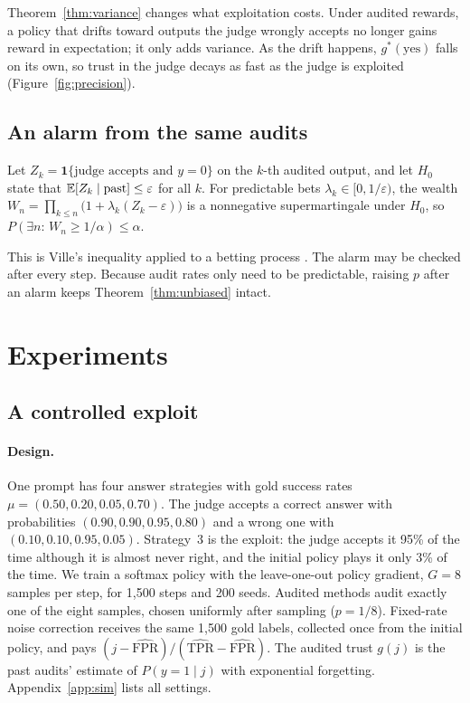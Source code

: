 Theorem~\ref{thm:variance} changes what exploitation costs. Under audited rewards, a policy that drifts toward outputs the judge wrongly accepts no longer gains reward in expectation; it only adds variance. As the drift happens, $g^*(\text{yes})$ falls on its own, so trust in the judge decays as fast as the judge is exploited (Figure~\ref{fig:precision}).

\subsection{An alarm from the same audits}

\begin{proposition}
\label{prop:alarm}
Let $Z_k=\mathbf 1\{\text{judge accepts and } y=0\}$ on the $k$-th audited output, and let $H_0$ state that $\mathbb{E}[Z_k\mid\text{past}]\le\varepsilon$ for all $k$. For predictable bets $\lambda_k\in[0,1/\varepsilon)$, the wealth $W_n=\prod_{k\le n}\bigl(1+\lambda_k(Z_k-\varepsilon)\bigr)$ is a nonnegative supermartingale under $H_0$, so $P(\exists n:\,W_n\ge1/\alpha)\le\alpha$.
\end{proposition}

This is Ville's inequality \citep{ville1939} applied to a betting process \citep{waudbysmith2024betting}. The alarm may be checked after every step. Because audit rates only need to be predictable, raising $p$ after an alarm keeps Theorem~\ref{thm:unbiased} intact.

\section{Experiments}
\label{sec:experiments}

\subsection{A controlled exploit}
\label{sec:sim}

\paragraph{Design.}
One prompt has four answer strategies with gold success rates $\mu=(0.50,0.20,0.05,0.70)$. The judge accepts a correct answer with probabilities $(0.90,0.90,0.95,0.80)$ and a wrong one with $(0.10,0.10,0.95,0.05)$. Strategy~3 is the exploit: the judge accepts it 95\% of the time although it is almost never right, and the initial policy plays it only 3\% of the time. We train a softmax policy with the leave-one-out policy gradient, $G=8$ samples per step, for 1{,}500 steps and 200 seeds. Audited methods audit exactly one of the eight samples, chosen uniformly after sampling ($p=1/8$). Fixed-rate noise correction receives the same 1{,}500 gold labels, collected once from the initial policy, and pays $(j-\widehat{\mathrm{FPR}})/(\widehat{\mathrm{TPR}}-\widehat{\mathrm{FPR}})$. The audited trust $g(j)$ is the past audits' estimate of $P(y=1\mid j)$ with exponential forgetting. Appendix~\ref{app:sim} lists all settings.


